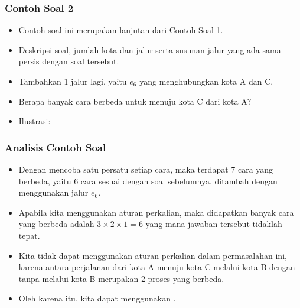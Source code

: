 \begin{frame}
\frametitle{Contoh Soal 2}
\begin{itemize}
  \item Contoh soal ini merupakan lanjutan dari Contoh Soal 1.
  \item Deskripsi soal, jumlah kota dan jalur serta susunan jalur yang ada sama persis dengan soal tersebut.
  \item Tambahkan 1 jalur lagi, yaitu $e_{6}$ yang menghubungkan kota A dan C.
  \item Berapa banyak cara berbeda untuk menuju kota C dari kota A?
  \item Ilustrasi:
  \newline
\end{itemize}
\end{frame}

\begin{frame}
\frametitle{Analisis Contoh Soal}
\begin{itemize}
  \item Dengan mencoba satu persatu setiap cara, maka terdapat 7 cara yang berbeda, yaitu 6 cara sesuai dengan soal sebelumnya, ditambah dengan menggunakan jalur $e_{6}$.
  \item Apabila kita menggunakan aturan perkalian, maka didapatkan banyak cara yang berbeda adalah $3 \times 2 \times 1 = 6$ yang mana jawaban tersebut tidaklah tepat.
  \item Kita tidak dapat menggunakan aturan perkalian dalam permasalahan ini, karena antara perjalanan dari kota A menuju kota C melalui kota B dengan tanpa melalui kota B merupakan 2 proses yang berbeda.
  \item Oleh karena itu, kita dapat menggunakan .
\end{itemize}
\end{frame}

